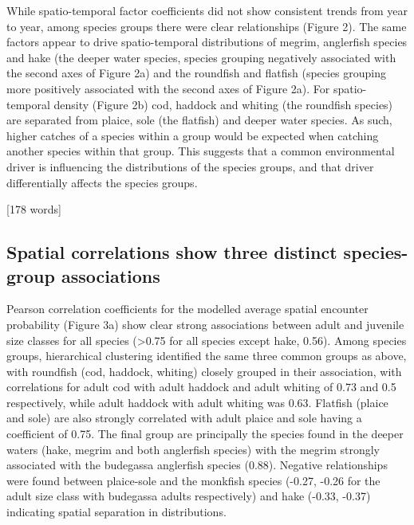 \documentclass{nature}
\begin{document}
\begin{linenumbers}
While spatio-temporal factor coefficients did not show consistent trends from
year to year, among species groups there were clear relationships (Figure 2). The same factors appear to drive spatio-temporal distributions of
megrim, anglerfish species and hake (the deeper water species, species grouping
negatively associated with the second axes of Figure 2a) and the roundfish
and flatfish (species grouping more positively associated with the second axes of Figure 2a). For spatio-temporal density (Figure 2b) cod, haddock
and whiting (the roundfish species) are separated from plaice, sole (the
flatfish) and deeper water species. As such, higher catches of a species within
a group would be expected when catching another species within that group. This
suggests that a common environmental driver is influencing the distributions of
the species groups, and that driver differentially affects the species groups.  

[178 words]

\subsection{Spatial correlations show three distinct species-group associations}
Pearson correlation coefficients for the modelled average spatial encounter
probability (Figure 3a) show clear strong associations between adult and
juvenile size classes for all species (\textgreater 0.75 for all species except
hake, 0.56).  Among species groups, hierarchical clustering identified the same
three common groups as above, with roundfish (cod, haddock, whiting) closely
grouped in their association, with correlations for adult cod with adult
haddock and adult whiting of 0.73 and 0.5 respectively, while adult haddock
with adult whiting was 0.63. Flatfish (plaice and sole) are also strongly
correlated with adult plaice and sole having a coefficient of 0.75.  The final
group are principally the species found in the deeper waters (hake, megrim and
both anglerfish species) with the megrim strongly associated with the budegassa
anglerfish species (0.88). Negative relationships were found between plaice-sole and the monkfish species (-0.27, -0.26 for the adult size class with
budegassa adults respectively) and hake (-0.33, -0.37) indicating spatial separation in distributions.


\end{linenumbers}
\end{document}
